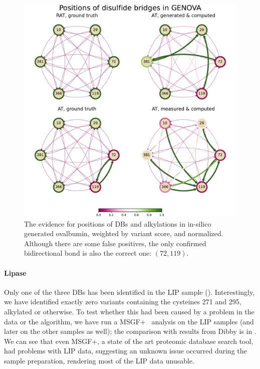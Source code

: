 \begin{figure}
  \centering
  \includegraphics[width=1\linewidth]{img/genova.pdf}
  \caption{The evidence for positions of DBs and alkylations in in-silico generated ovalbumin, weighted by variant score, and normalized. Although there are some false positives, the only confirmed bidirectional bond is also the correct one: \((72, 119)\).}\label{fig:genova}
\end{figure}

\paragraph{Lipase} Only one of the three DBs has been identified in the LIP sample (). Interestingly, we have identified exactly zero variants containing the cysteines 271 and 295, alkylated or otherwise. To test whether this had been caused by a problem in the data or the algorithm, we have run a MSGF+~\cite{kim2014ms} analysis on the LIP samples (and later on the other samples as well); the comparison with results from Dibby is in . We can see that even MSGF+, a state of the art proteomic database search tool, had problems with LIP data, suggesting an unknown issue occurred during the sample preparation, rendering most of the LIP data unusable.



